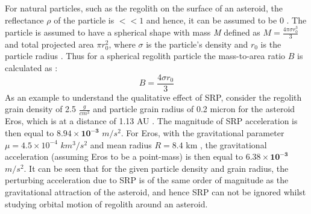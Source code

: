 For natural particles, such as the regolith on the surface of an asteroid, the reflectance $\rho$ of the particle is $<<1$ and hence, it can be assumed to be 0 \cite{scheeres_srp_regolith}. The particle is assumed to have a spherical shape with mass \textit{M} defined as $M = \frac{4 \pi \sigma r_0^3}{3}$ and total projected area $\pi r_0^2$, where $\sigma$ is the particle's density and $r_0$ is the particle radius \cite{scheeres_srp_regolith}. Thus for a spherical regolith particle the mass-to-area ratio $B$ is calculated as \cite{scheeres_srp_regolith}:
\begin{equation}
\label{regolith_B}
B = \frac{4 \sigma r_0}{3}
\end{equation}
%
As an example to understand the qualitative effect of \gls{SRP}, consider the regolith grain density of 2.5 $\frac{g}{cm^3}$ and particle grain radius of 0.2 micron for the asteroid Eros, which is at a distance of 1.13 AU \cite{scheeres_srp_regolith}. The magnitude of \gls{SRP} acceleration is then equal to $\mathbf{8.94 \times 10^{-3}}$ $m/s^2$. For Eros, with the gravitational parameter $\mu = 4.5 \times 10^{-4}$ $km^3/s^2$ and mean radius $R = 8.4$ km \cite{scheeres_srp_regolith}, the gravitational acceleration (assuming Eros to be a point-mass) is then equal to $\mathbf{6.38 \times 10^{-3}}$ $m/s^2$. It can be seen that for the given particle density and grain radius, the perturbing acceleration due to \gls{SRP} is of the same order of magnitude as the gravitational attraction of the asteroid, and hence \gls{SRP} can not be ignored whilst studying orbital motion of regolith around an asteroid.

